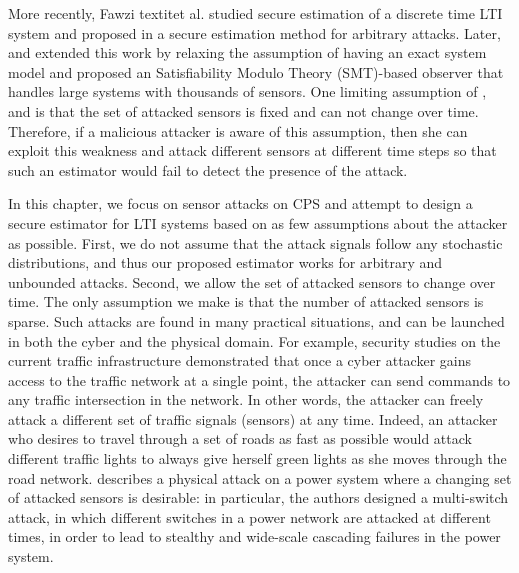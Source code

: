 \documentclass[../../thesis.tex]{subfiles}
\begin{document}
More recently, Fawzi textit{et al.} studied secure estimation of a discrete time LTI system and proposed in \cite{Fawzi2014} a secure estimation method for arbitrary attacks. 
Later, \cite{Pajic:2014} and \cite{shoukry2016smt} extended this work by relaxing the assumption of having an exact system model and proposed an Satisfiability Modulo Theory (SMT)-based observer that handles large systems with thousands of sensors. 
One limiting assumption of \cite{Fawzi:2014}, \cite{Pajic:2014} and \cite{shoukry2016smt} is that the set of attacked sensors is fixed and can not change over time. 
Therefore, if a malicious attacker is aware of this assumption, then she can exploit this weakness and attack different sensors at different time steps so that such an estimator would fail to detect the presence of the attack.

In this chapter, we focus on sensor attacks on CPS and attempt to design a secure estimator for LTI systems based on as few assumptions about the attacker as possible. 
First, we do not assume that the attack signals follow any stochastic distributions, and thus our proposed estimator works for arbitrary and unbounded attacks.
Second, we allow the set of attacked sensors to change over time.
The only assumption we make is that the number of attacked sensors is sparse.
Such attacks are found in many practical situations, and can be launched in both the cyber and the physical domain.
For example, security studies on the current traffic infrastructure \cite{ghena2014traffic} demonstrated that once a cyber attacker gains access to the traffic network at a single point, the attacker can send commands to any traffic intersection in the network. 
In other words, the attacker can freely attack a different set of traffic signals (sensors) at any time. Indeed, an attacker who desires to travel through a set of roads as fast as possible would attack different traffic lights to always give herself green lights as she moves through the road network. 
\cite{liu2014coordinated} describes a physical attack on a power system where a changing set of attacked sensors is desirable: in particular, the authors designed a multi-switch attack, in which different switches in a power network are attacked at different times, in order to lead to stealthy and wide-scale cascading failures in the power system.
\end{document}
